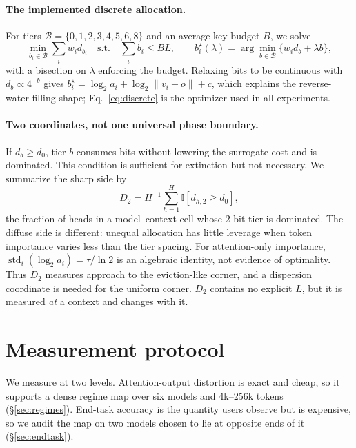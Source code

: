 \documentclass{article}
\theoremstyle{definition}
\begin{document}
\paragraph{The implemented discrete allocation.}
For tiers $\mathcal B=\{0,1,2,3,4,5,6,8\}$ and an average key budget $B$, we solve
\begin{equation}
 \min_{b_i\in\mathcal B}\sum_i w_i d_{b_i}
 \quad\text{s.t.}\quad \sum_i b_i\le BL,
 \qquad
 b_i^\star(\lambda)=\arg\min_{b\in\mathcal B}\{w_i d_b+\lambda b\},
 \label{eq:discrete}
\end{equation}
with a bisection on $\lambda$ enforcing the budget.  Relaxing bits to be continuous with $d_b\propto4^{-b}$ gives $b_i^\star=\log_2a_i+\log_2\|v_i-o\|+c$, which explains the reverse-water-filling shape; Eq.~\ref{eq:discrete} is the optimizer used in all experiments.

\paragraph{Two coordinates, not one universal phase boundary.}
If $d_b\ge d_0$, tier $b$ consumes bits without lowering the surrogate cost and is dominated.  This condition is sufficient for extinction but not necessary.  We summarize the sharp side by
\begin{equation}
 D_2=H^{-1}\textstyle\sum_{h=1}^{H}\mathbb I[d_{h,2}\ge d_0],
 \label{eq:d2}
\end{equation}
the fraction of heads in a model--context cell whose 2-bit tier is dominated.  The diffuse side is different: unequal allocation has little leverage when token importance varies less than the tier spacing.  For attention-only importance, $\operatorname{std}_i(\log_2a_i)=\tau/\ln2$ is an algebraic identity, not evidence of optimality.  Thus $D_2$ measures approach to the eviction-like corner, and a dispersion coordinate is needed for the uniform corner.  $D_2$ contains no explicit $L$, but it is measured \emph{at} a context and changes with it.

\section{Measurement protocol}
\label{sec:protocol}

We measure at two levels.  Attention-output distortion is exact and cheap, so it supports a dense regime map over six models and 4k--256k tokens (\S\ref{sec:regimes}).  End-task accuracy is the quantity users observe but is expensive, so we audit the map on two models chosen to lie at opposite ends of it (\S\ref{sec:endtask}).
\end{document}
